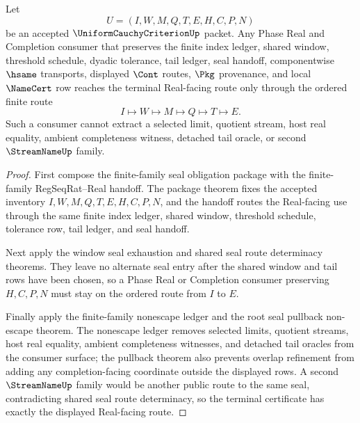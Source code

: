 \begin{theorem}
\label{thm:uniform-cauchy-criterion-terminal-real-route-certificate}
Let
$$
U=(I,W,M,Q,T,E,H,C,P,N)
$$
be an accepted $\UniformCauchyCriterionUp$ packet. Any Phase Real and Completion consumer that preserves the finite index ledger, shared window, threshold schedule, dyadic tolerance, tail ledger, seal handoff, componentwise $\hsame$ transports, displayed $\Cont$ routes, $\Pkg$ provenance, and local $\NameCert$ row reaches the terminal Real-facing route only through the ordered finite route
$$
I \longmapsto W \longmapsto M \longmapsto Q \longmapsto T \longmapsto E.
$$
Such a consumer cannot extract a selected limit, quotient stream, host real equality, ambient completeness witness, detached tail oracle, or second $\StreamNameUp$ family.
\end{theorem}
\begin{proof}
First compose the finite-family seal obligation package with the finite-family RegSeqRat--Real handoff. The package theorem fixes the accepted inventory $I,W,M,Q,T,E,H,C,P,N$, and the handoff routes the Real-facing use through the same finite index ledger, shared window, threshold schedule, tolerance row, tail ledger, and seal handoff.

Next apply the window seal exhaustion and shared seal route determinacy theorems. They leave no alternate seal entry after the shared window and tail rows have been chosen, so a Phase Real or Completion consumer preserving $H,C,P,N$ must stay on the ordered route from $I$ to $E$.

Finally apply the finite-family nonescape ledger and the root seal pullback non-escape theorem. The nonescape ledger removes selected limits, quotient streams, host real equality, ambient completeness witnesses, and detached tail oracles from the consumer surface; the pullback theorem also prevents overlap refinement from adding any completion-facing coordinate outside the displayed rows. A second $\StreamNameUp$ family would be another public route to the same seal, contradicting shared seal route determinacy, so the terminal certificate has exactly the displayed Real-facing route.
\end{proof}

